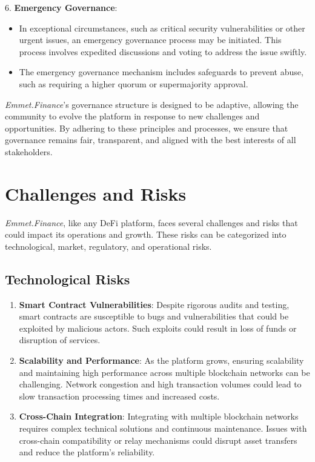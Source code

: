 \documentclass[12pt, a4paper]{article}
\begin{document}
6. \textbf{Emergency Governance}:
   \begin{itemize}
       \item In exceptional circumstances, such as critical security vulnerabilities or other urgent issues, an emergency governance process may be initiated. This process involves expedited discussions and voting to address the issue swiftly.
       \item The emergency governance mechanism includes safeguards to prevent abuse, such as requiring a higher quorum or supermajority approval.
   \end{itemize}

\textit{Emmet.Finance}'s governance structure is designed to be adaptive, allowing the community to evolve the platform in response to new challenges and opportunities. By adhering to these principles and processes, we ensure that governance remains fair, transparent, and aligned with the best interests of all stakeholders.

\section{Challenges and Risks}

\textit{Emmet.Finance}, like any DeFi platform, faces several challenges and risks that could impact its operations and growth. These risks can be categorized into technological, market, regulatory, and operational risks.

\subsection{Technological Risks}

\begin{enumerate}
    \item \textbf{Smart Contract Vulnerabilities}: Despite rigorous audits and testing, smart contracts are susceptible to bugs and vulnerabilities that could be exploited by malicious actors. Such exploits could result in loss of funds or disruption of services.
    \item \textbf{Scalability and Performance}: As the platform grows, ensuring scalability and maintaining high performance across multiple blockchain networks can be challenging. Network congestion and high transaction volumes could lead to slow transaction processing times and increased costs.
    \item \textbf{Cross-Chain Integration}: Integrating with multiple blockchain networks requires complex technical solutions and continuous maintenance. Issues with cross-chain compatibility or relay mechanisms could disrupt asset transfers and reduce the platform's reliability.
\end{enumerate}
\end{document}
